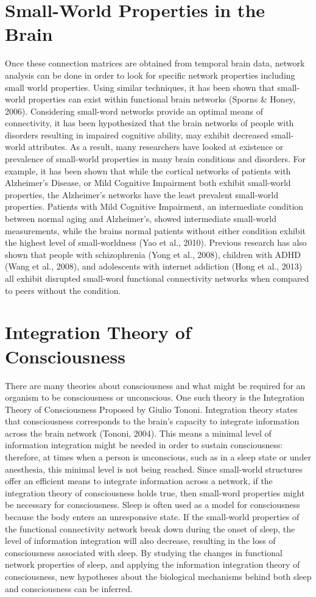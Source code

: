 \documentclass[12pt,letterpaper]{report}
\begin{document}
\section{Small-World Properties in the Brain}
	Once these connection matrices are obtained from temporal brain data, network analysis can be done in order to look for specific network properties including small world properties. Using similar techniques, it has been shown that small-world properties can exist within functional brain networks (Sporns & Honey, 2006). 
	Considering small-word networks provide an optimal means of connectivity, it has been hypothesized that the brain networks of people with disorders resulting in impaired cognitive ability, may exhibit decreased small-world attributes. As a result, many researchers have looked at existence or prevalence of small-world properties in many brain conditions and disorders. For example, it has been shown that while the cortical networks of patients with Alzheimer’s Disease, or Mild Cognitive Impairment both exhibit small-world properties, the Alzheimer’s networks have the least prevalent small-world properties. Patients with Mild Cognitive Impairment, an intermediate condition between normal aging and Alzheimer’s, showed intermediate small-world measurements, while the brains normal patients without either condition exhibit the highest level of small-worldness (Yao et al., 2010).  Previous research has also shown that people with schizophrenia (Yong et al., 2008), children with ADHD (Wang et al., 2008), and adolescents with internet addiction (Hong et al., 2013) all exhibit disrupted small-word functional connectivity networks when compared to peers without the condition.
\section{Integration Theory of Consciousness}
	There are many theories about consciousness and what might be required for an organism to be consciousness or unconscious. One such theory is the Integration Theory of Consciousness Proposed by Giulio Tononi. Integration theory states that consciousness corresponds to the brain's capacity to integrate information across the brain network (Tononi, 2004). This means a minimal level of information integration might be needed in order to sustain consciousness: therefore, at times when a person is unconscious, such as in a sleep state or under anesthesia, this minimal level is not being reached. Since small-world structures offer an efficient means to integrate information across a network, if the integration theory of consciousness holds true, then small-word properties might be necessary for consciousness.
	Sleep is often used as a model for consciousness because the body enters an unresponsive state. If the small-world properties of the functional connectivity network break down during the onset of sleep, the level of information integration will also decrease, resulting in the loss of consciousness associated with sleep. By studying the changes in functional network properties of sleep, and applying the information integration theory of consciousness, new hypotheses about the biological mechanisms behind both sleep and consciousness can be inferred.
\end{document}
